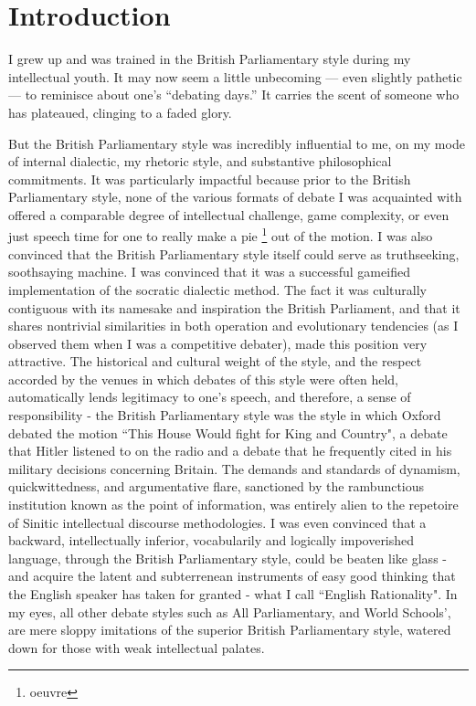 \section{Introduction}

I grew up and was trained in the British Parliamentary style during my intellectual youth. It may now seem a little unbecoming — even slightly pathetic — to reminisce about one’s “debating days.” It carries the scent of someone who has plateaued, clinging to a faded glory. 

But the British Parliamentary style was incredibly influential to me, on my mode of internal dialectic, my rhetoric style, and substantive philosophical commitments. It was particularly impactful because prior to the British Parliamentary style, none of the various formats of debate I was acquainted with offered a comparable degree of intellectual challenge, game complexity, or even just speech time for one to really make a pie \footnote{oeuvre} out of the motion. I was also convinced that the British Parliamentary style itself could serve as truthseeking, soothsaying machine. I was convinced that it was a successful gameified implementation of the socratic dialectic method. The fact it was culturally contiguous with its namesake and inspiration the British Parliament, and that it shares nontrivial similarities in both operation and evolutionary tendencies (as I observed them when I was a competitive debater), made this position very attractive. The historical and cultural weight of the style, and the respect accorded by the venues in which debates of this style were often held, automatically lends legitimacy to one's speech, and therefore, a sense of responsibility - the British Parliamentary style was the style in which Oxford debated the motion “This House Would fight for King and Country", a debate that Hitler listened to on the radio and a debate that he frequently cited in his military decisions concerning Britain. The demands and standards of dynamism, quickwittedness, and argumentative flare, sanctioned by the rambunctious institution known as the point of information, was entirely alien to the repetoire of Sinitic intellectual discourse methodologies. I was even convinced that a backward, intellectually inferior, vocabularily and logically impoverished language, through the British Parliamentary style, could be beaten like glass - and acquire the latent and subterrenean instruments of easy good thinking that the English speaker has taken for granted - what I call “English Rationality". In my eyes, all other debate styles such as All Parliamentary, and World Schools', are mere sloppy imitations of the superior British Parliamentary style, watered down for those with weak intellectual palates.


